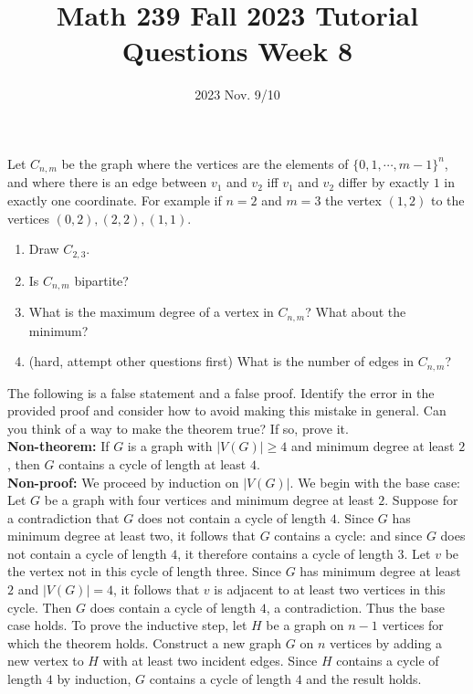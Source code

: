 \title{Math 239 Fall 2023 Tutorial Questions Week 8}

\date{2023 Nov. 9/10}
\maketitle

\begin{enumerate}

     Let $C_{n,m}$ be the graph where the vertices are the elements of $\{ 0, 1 , \cdots, m-1\}^n$, and where there is an edge between $v_1$ and $v_2$ iff $v_1 $ and $v_2$ differ by exactly $1$ in exactly one coordinate. For example if $n=2$ and $m=3$ the vertex $(1,2)$ to the vertices $(0,2) , (2,2) , (1,1)$.
    \begin{enumerate}
        \item Draw $C_{2,3}$.
        \item Is $C_{n,m}$ bipartite?
        \item What is the maximum degree of a vertex in $C_{n,m}$? What about the minimum?
        \item (hard, attempt other questions first) What is the number of edges in $C_{n,m}$?
    \end{enumerate}
    

    
    
    
     The following is a false statement and a false proof. Identify the error in the provided proof and consider how to avoid making this mistake in general. Can you think of a way to make the theorem true? If so, prove it. 
    \\
    \textbf{Non-theorem:} If $G$ is a graph with $|V(G)|\geq 4$ and minimum degree at least $2$, then $G$ contains a cycle of length at least $4$.
    \\
    \textbf{Non-proof:} We proceed by induction on $|V(G)|$. We begin with the base case: Let $G$ be a graph with four vertices and minimum degree at least $2$. Suppose for a contradiction that $G$ does not contain a cycle of length $4$. Since $G$ has minimum degree at least two, it follows that $G$ contains a cycle: and since $G$ does not contain a cycle of length $4$, it therefore contains a cycle of length $3$. Let $v$ be the vertex not in this cycle of length three. Since $G$ has minimum degree at least $2$ and $|V(G)|=4$, it follows that $v$ is adjacent to at least two vertices in this cycle. Then $G$ does contain a cycle of length $4$, a contradiction. Thus the base case holds. To prove the inductive step, let $H$ be a graph on $n-1$ vertices for which the theorem holds. Construct a new graph $G$ on $n$ vertices by adding a new vertex to $H$ with at least two incident edges. Since $H$ contains a cycle of length $4$ by induction, $G$ contains a cycle of length $4$ and the result holds. 
    

\end{enumerate}
